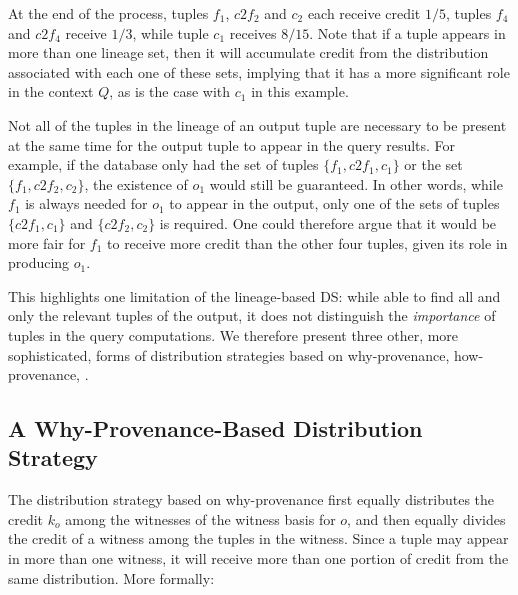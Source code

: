 At the end of the process, tuples $f_1$, $c2f_2$ and $c_2$ each receive credit $1/5$, tuples $f_4$ and $c2f_4$ receive $1/3$, while tuple $c_1$ receives $8/15$.  
Note that if a tuple appears in more than one lineage set, then it will accumulate credit from the distribution associated with each one of these sets, implying that it has a more significant role in the context $Q$, as is the case with $c_1$ in this example.
 
Not all of the tuples in the lineage of an output tuple are necessary to be present at the same time for the output tuple to appear in the query results.  For example, if the database only had the set of  tuples $\{f_1, c2f_1, c_1\}$ or the set $\{f_1, c2f_2, c_2\}$, the existence of $o_1$ would still be guaranteed. 
In other words, while $f_1$ is always needed for $o_1$ to appear in the output, 
only one of the sets of tuples $\{ c2f_1, c_1 \}$ and $\{ c2f_2, c_2 \}$ is required. 
One could therefore argue that it would be more fair for $f_1$ to receive more credit than the other four tuples, given its role in producing $o_1$.  

This highlights one limitation of the lineage-based DS: while able to find all and only the relevant tuples of the output, it does not distinguish the \emph{importance} of tuples in the query computations. 
We therefore present three other, more sophisticated, forms of distribution strategies based on why-provenance, how-provenance, .

\subsection{A Why-Provenance-Based Distribution Strategy}
The distribution strategy based on why-provenance first equally distributes the credit $k_o$ among the witnesses of the witness basis for $o$, and then equally divides the credit of a witness among the tuples in the witness. 
Since a tuple may appear in more than one witness, it will receive more than one portion of credit from the same distribution. More formally:


